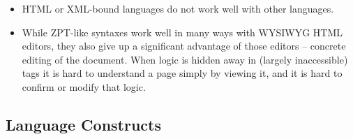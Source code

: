 \begin{itemize}
\item HTML or XML-bound languages do not work well with other languages.
\item While ZPT-like syntaxes work well in many ways with WYSIWYG HTML editors,
     they also give up a significant advantage of those editors -- concrete
     editing of the document.  When logic is hidden away in (largely
     inaccessible) tags it is hard to understand a page simply by viewing it,
     and it is hard to confirm or modify that logic.
\end{itemize}

\subsection{Language Constructs}
\label{language.constructs}

